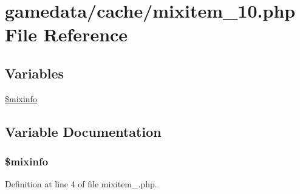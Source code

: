 \hypertarget{mixitem__10_8php}{\section{gamedata/cache/mixitem\+\_\+10.php File Reference}
\label{mixitem__10_8php}
}
\subsection*{Variables}
\begin{DoxyCompactItemize}
\item 
\hyperlink{mixitem__10_8php_af760ceec3cca51f1e5947afbbd300d36}{\$mixinfo}
\end{DoxyCompactItemize}


\subsection{Variable Documentation}
\hypertarget{mixitem__10_8php_af760ceec3cca51f1e5947afbbd300d36}{
\subsubsection[{\$mixinfo}]{\setlength{\rightskip}{0pt plus 5cm}\$mixinfo}}\label{mixitem__10_8php_af760ceec3cca51f1e5947afbbd300d36}


Definition at line 4 of file mixitem\+\_.\+php.

